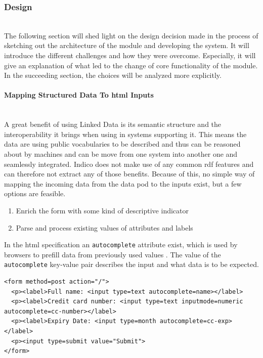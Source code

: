 \subsubsection{Design}\label{poc2:design}\mbox{}\\

The following section will shed light on the design decision made in the process of sketching out the architecture of the module and developing the system. It will introduce the different challenges and how they were overcome. Especially, it will give an explanation of what led to the change of core functionality of the module. In the succeeding section, the choices will be analyzed more explicitly.
\vspace{0.5cm}
\paragraph{Mapping Structured Data To \gls{html} Inputs}\mbox{}\\

A great benefit of using Linked Data is its semantic structure and the interoperability it brings when using in systems supporting it. This means the data are using public vocabularies to be described and thus can be reasoned about by machines and can be move from one system into another one and seamlessly integrated. Indico does not make use of any common \gls{rdf} features and can therefore not extract any of those benefits. Because of this, no simple way of mapping the incoming data from the data pod to the inputs exist, but a few options are feasible.

\begin{enumerate}
    \item Enrich the form with some kind of descriptive indicator
    \item Parse and process existing values of attributes and labels
\end{enumerate}

In the \gls{html} specification an \texttt{autocomplete} attribute exist, which is used by browsers to prefill data from previously used values \cite{html-spec}. The value of the \texttt{autocomplete} key-value pair describes the input and what data is to be expected.

\begin{lstlisting}[language=Other,columns=fullflexible, caption={Autocomplete attribute on input field}, label={lst:autocomplete-input}]
<form method=post action="/">
  <p><label>Full name: <input type=text autocomplete=name></label>
  <p><label>Credit card number: <input type=text inputmode=numeric autocomplete=cc-number></label>
  <p><label>Expiry Date: <input type=month autocomplete=cc-exp></label>
  <p><input type=submit value="Submit">
</form>
\end{lstlisting}

